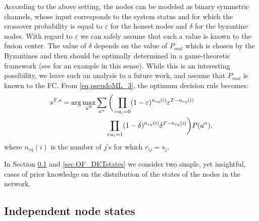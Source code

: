 \documentclass[10pt,peerreview,draftcls,onecolumn]{IEEEtran}
\begin{document}
According to the above setting, the nodes can be modeled as binary symmetric channels, whose input corresponds to the system status and for which the crossover probability is equal to $\varepsilon$ for the honest nodes and $\delta$ for the byzantine nodes. With regard to $\varepsilon$ we can safely assume that such a value is known to the fusion center. The value of $\delta$ depends on the value of  $P_{mal}$ which is chosen by the Byzantines and then should be optimally determined in a game-theoretic framework (see \cite{KBKV13} for an example in this sense). While this is an interesting possibility, we leave such an analysis to a future work, and assume that $P_{mal}$ is known to the FC.
From \eqref{eq.pseudoML_3}, the optimum decision rule becomes:
\begin{align}
\label{eq.pseudoML_symm}
s^{T,*} =  \arg\max_{s^T} & \sum_{a^n} \bigg(\prod_{i:a_i = 0}  (1-\varepsilon)^{n_{eq}(i)} \varepsilon^{T-n_{eq}(i)} \bigg. \\ & \hspace{0.5cm} \bigg. \prod_{i:a_i = 1} (1-\delta)^{n_{eq}(i)} \delta^{T-n_{eq}(i)} \bigg) P(a^n),\nonumber
\end{align}
where $n_{eq}(i)$ is the number of $j$'s for which $r_{ij} = s_j$.

In Section \ref{sec.OF_Random} and \ref{sec.OF_DETstates} we consider two simple, yet insightful, cases of prior knowledge on the distribution of the states of the nodes in the network.

\subsection{Independent node states}
\label{sec.OF_Random}
\end{document}
